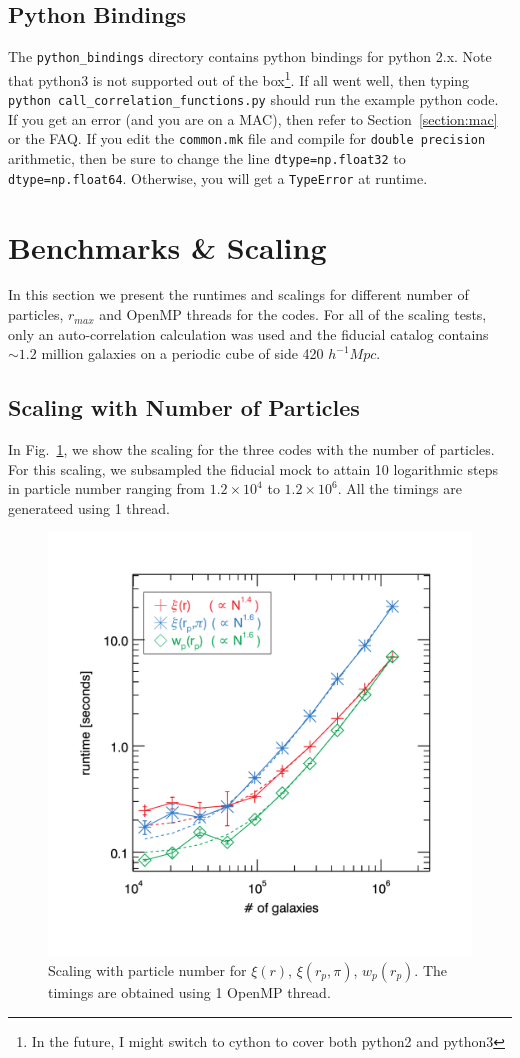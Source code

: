 \documentclass[12pt,titlepage]{article}
\let\stdsection\section
\newcommand{\rmax}{\ensuremath{{r_{max}}}\xspace}
\newcommand{\xir}{\ensuremath{{\xi(r)}}\xspace}
\newcommand{\wprp}{\ensuremath{{w_p(r_p)}}\xspace}
\newcommand{\xirppi}{\ensuremath{{\xi(r_p,\pi)}}\xspace}
\newcommand{\hMpc}{\ensuremath{{h^{-1}Mpc}}\xspace}
\begin{document}
\subsection{Python Bindings}
The \texttt{python\_bindings} directory contains python bindings for python 2.x. Note that python3 is not supported out of the box\footnote{In the future, I might switch to 
cython to cover both python2 and python3}. If all went well, then typing \texttt{python call\_correlation\_functions.py} should run the example python code. If you get 
an error (and you are on a MAC), then refer to Section~\ref{section:mac} or the FAQ. 
If you edit the \texttt{common.mk} file and compile for \texttt{double precision} arithmetic, then be sure to change the line \texttt{dtype=np.float32} to 
\texttt{dtype=np.float64}. Otherwise, you will get a \texttt{TypeError} at runtime. 

\stdsection{Benchmarks \& Scaling}
In this section we present the runtimes and scalings for different number of particles, \rmax and OpenMP threads for the codes. 
For all of the scaling tests, only an auto-correlation calculation was used and the fiducial catalog contains $\sim 1.2$ million 
galaxies on a periodic cube of side 420 \hMpc. 

\subsection{Scaling with Number of Particles}
In Fig.~\ref{fig:scaling_numpart}, we show the scaling for the three codes with the number of particles. For this scaling, we subsampled 
the fiducial mock to attain 10 logarithmic steps in particle number ranging from $1.2\times10^4$ to $1.2\times10^6$. All the timings are 
generateed using 1 thread. 
\begin{figure}[htbp]
\includegraphics[clip=true,width=\linewidth]{timings_Mr19_numpart}%
\caption{Scaling with particle number for \xir, \xirppi, \wprp. The timings are obtained 
using 1 OpenMP thread. }
\label{fig:scaling_numpart}
\end{figure}
\end{document}
